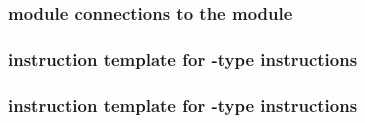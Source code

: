 
\subsubsection{\stpMod{} module connections to the \mxpMod{} module               \lispDone{}}  \label{hub: misc: stp: connections}  
\subsubsection{\stpMod{} instruction template for -type instructions \lispDone{}}  \label{hub: misc: stp: create}       
\subsubsection{\stpMod{} instruction template for -type   instructions \lispDone{}}  \label{hub: misc: stp: call}         
